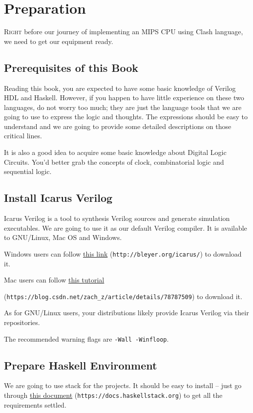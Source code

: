\chapter{Preparation}
\lettrine{R}{ight} before our journey of implementing an MIPS CPU using Clash language, we need to get our equipment ready.
\section{Prerequisites of this Book}
Reading this book, you are expected to have some basic knowledge of Verilog HDL and Haskell. However, if you happen to have little experience on these two languages, do not worry too much; they are just the language tools that we are going to use to express the logic and thoughts. The expressions should be easy to understand and we are going to provide some detailed descriptions on those critical lines.   

It is also a good idea to acquire some basic knowledge about Digital Logic Circuits. You'd better grab the concepts of clock, combinatorial logic and sequential logic.
\section{Install Icarus Verilog}
Icarus Verilog is a tool to synthesis Verilog sources and generate simulation executables. We are going to use it as our default Verilog compiler. It is available to GNU/Linux, Mac OS and Windows.

Windows users can follow \href{http://bleyer.org/icarus/}{this link} (\texttt{http://bleyer.org/icarus/}) to download it.

Mac users can follow \href{https://blog.csdn.net/zach_z/article/details/78787509}{this tutorial}

(\texttt{https://blog.csdn.net/zach_z/article/details/78787509}) to download it.

As for GNU/Linux users, your distributions likely provide Icarus Verilog via their repositories.

The recommended warning flags are \texttt{-Wall -Winfloop}.
\section{Prepare Haskell Environment}
We are going to use stack for the projects. It should be easy to install -- just go through \href{https://docs.haskellstack.org}{this document} (\texttt{https://docs.haskellstack.org}) to get all the requirements settled. 

